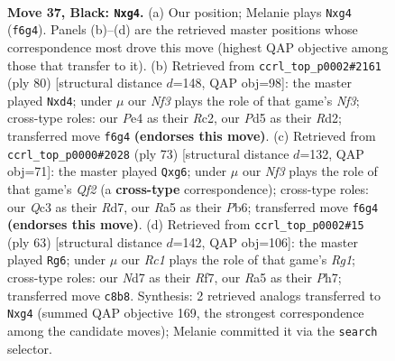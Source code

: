 \documentclass[11pt]{article}
\begin{document}
\clearpage

\begin{figure}[p]\centering
\begin{subfigure}{0.46\textwidth}\centering
\resizebox{\linewidth}{!}{%
\newchessgame
\chessboard[
  setfen={2r3k1/3n2p1/1p3n2/r2p2Qp/P3p1PN/2q5/2P2P1P/R2R1K2 b - - 0 37},
  showmover=false,
  pgfstyle=straightmove, color=movearrow, markmove={f6-g4}
]}
\caption{}
\end{subfigure}\hfill
\begin{subfigure}{0.46\textwidth}\centering
\resizebox{\linewidth}{!}{%
\newchessgame
\chessboard[
  setfen={7r/1b3p2/1p3kr1/pP3n2/P2p2qP/2N1PN2/2RR1QB1/6K1 w - - 0 41},
  showmover=false,
  pgfstyle=straightmove, color=movearrow, markmove={f3-d4}
]}
\caption{}
\end{subfigure}
\\[4pt]
\begin{subfigure}{0.46\textwidth}\centering
\resizebox{\linewidth}{!}{%
\newchessgame
\chessboard[
  setfen={4r1k1/p2r1qp1/1p2NnQ1/3p1P2/P3p3/6RP/1P3P2/3R2K1 b - - 5 37},
  showmover=false,
  pgfstyle=straightmove, color=movearrow, markmove={f7-g6}
]}
\caption{}
\end{subfigure}\hfill
\begin{subfigure}{0.46\textwidth}\centering
\resizebox{\linewidth}{!}{%
\newchessgame
\chessboard[
  setfen={6rk/1p3r1p/2n2p1q/pQ2nR1N/P7/2Pp3P/1P4P1/3N1R1K b - - 0 32},
  showmover=false,
  pgfstyle=straightmove, color=movearrow, markmove={g8-g6}
]}
\caption{}
\end{subfigure}
\caption{\textbf{Move 37, Black: \texttt{Nxg4}.} (a) Our position; Melanie plays \texttt{Nxg4} (\texttt{f6g4}). Panels (b)--(d) are the retrieved master positions whose correspondence most drove this move (highest QAP objective among those that transfer to it). (b) Retrieved from \texttt{ccrl\_top\_p0002\#2161} (ply 80) [structural distance $d$=148, QAP obj=98]: the master played \texttt{Nxd4}; under $\mu$ our \emph{Nf3} plays the role of that game's \emph{Nf3}; cross-type roles: our \emph{P}e4 as their \emph{R}c2, our \emph{P}d5 as their \emph{R}d2; transferred move \texttt{f6g4} \textbf{(endorses this move)}. (c) Retrieved from \texttt{ccrl\_top\_p0000\#2028} (ply 73) [structural distance $d$=132, QAP obj=71]: the master played \texttt{Qxg6}; under $\mu$ our \emph{Nf3} plays the role of that game's \emph{Qf2} (a \textbf{cross-type} correspondence); cross-type roles: our \emph{Q}c3 as their \emph{R}d7, our \emph{R}a5 as their \emph{P}b6; transferred move \texttt{f6g4} \textbf{(endorses this move)}. (d) Retrieved from \texttt{ccrl\_top\_p0002\#15} (ply 63) [structural distance $d$=142, QAP obj=106]: the master played \texttt{Rg6}; under $\mu$ our \emph{Rc1} plays the role of that game's \emph{Rg1}; cross-type roles: our \emph{N}d7 as their \emph{R}f7, our \emph{R}a5 as their \emph{P}h7; transferred move \texttt{c8b8}. Synthesis: 2 retrieved analogs transferred to \texttt{Nxg4} (summed QAP objective 169, the strongest correspondence among the candidate moves); Melanie committed it via the \texttt{search} selector.}
\label{fig:thought-m73}
\end{figure}
\end{document}
